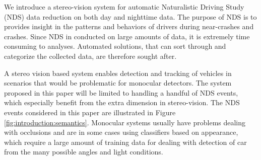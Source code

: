 
We introduce a stereo-vision system for automatic Naturalistic Driving Study (NDS) data reduction on both day and nighttime data. The purpose of NDS is to provides insight in the patterns and behaviors of drivers during near-crashes and crashes. Since NDS in conducted on large amounts of data, it is extremely time consuming to analyses. Automated solutions, that can sort through and categorize the collected data, are therefore sought after.

A stereo vision based system enables detection and tracking of vehicles in scenarios that would be problematic for monocular detectors. The system proposed in this paper will be limited to handling a handful of NDS events, which especially benefit from the extra dimension in stereo-vision. The NDS events considered in this paper are illustrated in Figure \ref{fig:introduction:semantics}. Monocular systems usually have problems dealing with occlusions and are in some cases using classifiers based on appearance, which require a large amount of training data for dealing with detection of car from the many possible angles and light conditions. 

